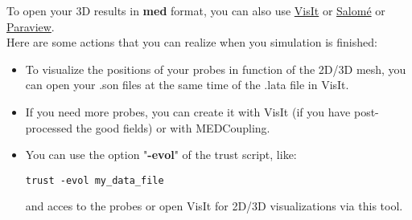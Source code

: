 To open your 3D results in \textbf{med} format, you can also use \href{https://wci.llnl.gov/simulation/computer-codes/visit}{VisIt} or \href{http://www.salome-platform.org}{Salom\'e} or \href{http://www.paraview.org}{Paraview}.\\

Here are some actions that you can realize when you simulation is finished:
\begin{itemize}
\item To visualize the positions of your probes in function of the 2D/3D mesh, you can open your .son files at the same time of the .lata file in VisIt.
\item If you need more probes, you can create it with VisIt (if you have post-processed the good fields) or with MEDCoupling.
\item You can use the option "\textbf{-evol}" of the trust script, like:
\begin{verbatim}
trust -evol my_data_file
\end{verbatim}
and acces to the probes or open VisIt for 2D/3D visualizations via this tool.
\end{itemize}



